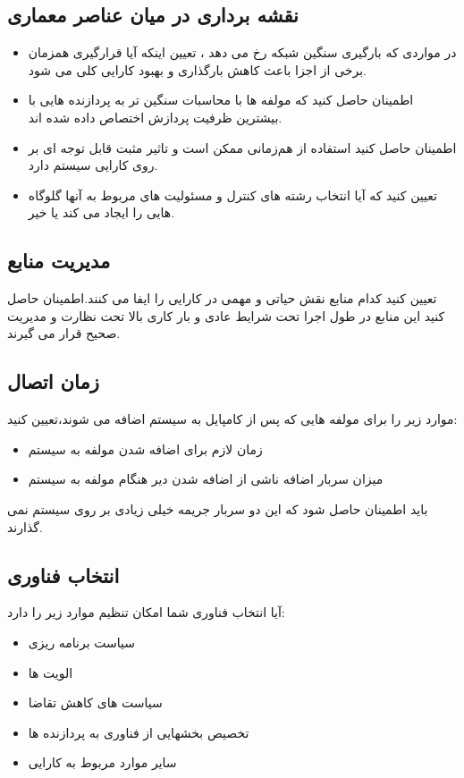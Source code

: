 \subsection{نقشه برداری در میان عناصر معماری}
\begin{itemize}
\item
در مواردی که بارگیری سنگین شبکه رخ می دهد ، تعیین اینکه آیا قرارگیری همزمان برخی از اجزا باعث کاهش بارگذاری و بهبود کارایی کلی می شود.
\item
اطمینان حاصل کنید که مولفه ها با محاسبات سنگین تر به پردازنده هایی با بیشترین ظرفیت پردازش اختصاص داده شده اند.
\item
اطمینان حاصل کنید استفاده از هم‌زمانی ممکن است و تاثیر مثبت قابل توجه ای بر روی کارایی سیستم دارد.
\item
تعیین کنید که آیا انتخاب رشته های کنترل و مسئولیت های مربوط به آنها گلوگاه هایی را ایجاد می کند یا خیر.
\end{itemize}
\subsection{مدیریت منابع}
تعیین کنید کدام منابع نقش حیاتی و مهمی در کارایی را ایفا می کنند.اطمینان حاصل کنید این منابع در طول اجرا تحت شرایط عادی و بار کاری بالا تحت نظارت و مدیریت صحیح قرار می گیرند.
\subsection{زمان اتصال}
موارد زیر را برای مولفه هایی که پس از کامپایل  به سیستم اضافه می شوند،‌تعیین کنید:
\begin{itemize}
\item
زمان لازم برای اضافه شدن مولفه به سیستم
\item
میزان سربار اضافه ناشی از اضافه شدن دیر هنگام مولفه به سیستم
\end{itemize}
باید اطمینان حاصل شود که این دو سربار جریمه خیلی زیادی بر روی سیستم نمی گذارند.
\subsection{انتخاب فناوری}
آیا انتخاب فناوری شما امکان تنظیم موارد زیر را دارد:
\begin{itemize}
\item
سیاست برنامه ریزی
\item
الویت ها
\item
سیاست های کاهش تقاضا
\item
تخصیص بخشهایی از فناوری به پردازنده ها
\item
سایر موارد مربوط به کارایی
\end{itemize}







